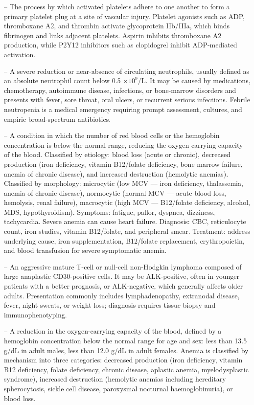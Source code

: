 -- The process by which activated platelets adhere to one another to form a primary platelet plug at a site of vascular injury. Platelet agonists such as ADP, thromboxane A2, and thrombin activate glycoprotein IIb/IIIa, which binds fibrinogen and links adjacent platelets. Aspirin inhibits thromboxane A2 production, while P2Y12 inhibitors such as clopidogrel inhibit ADP-mediated activation.

-- A severe reduction or near-absence of circulating neutrophils, usually defined as an absolute neutrophil count below 0.5 $\times 10^9$/L. It may be caused by medications, chemotherapy, autoimmune disease, infections, or bone-marrow disorders and presents with fever, sore throat, oral ulcers, or recurrent serious infections. Febrile neutropenia is a medical emergency requiring prompt assessment, cultures, and empiric broad-spectrum antibiotics.

-- A condition in which the number of red blood cells or the hemoglobin concentration is below the normal range, reducing the oxygen-carrying capacity of the blood. Classified by etiology: blood loss (acute or chronic), decreased production (iron deficiency, vitamin B12/folate deficiency, bone marrow failure, anemia of chronic disease), and increased destruction (hemolytic anemias). Classified by morphology: microcytic (low MCV — iron deficiency, thalassemia, anemia of chronic disease), normocytic (normal MCV — acute blood loss, hemolysis, renal failure), macrocytic (high MCV — B12/folate deficiency, alcohol, MDS, hypothyroidism). Symptoms: fatigue, pallor, dyspnea, dizziness, tachycardia. Severe anemia can cause heart failure. Diagnosis: CBC, reticulocyte count, iron studies, vitamin B12/folate, and peripheral smear. Treatment: address underlying cause, iron supplementation, B12/folate replacement, erythropoietin, and blood transfusion for severe symptomatic anemia.

-- An aggressive mature T-cell or null-cell non-Hodgkin lymphoma composed of large anaplastic CD30-positive cells. It may be ALK-positive, often in younger patients with a better prognosis, or ALK-negative, which generally affects older adults. Presentation commonly includes lymphadenopathy, extranodal disease, fever, night sweats, or weight loss; diagnosis requires tissue biopsy and immunophenotyping.

-- A reduction in the oxygen-carrying capacity of the blood, defined by a hemoglobin concentration below the normal range for age and sex: less than 13.5 g/dL in adult males, less than 12.0 g/dL in adult females. Anemia is classified by mechanism into three categories: decreased production (iron deficiency, vitamin B12 deficiency, folate deficiency, chronic disease, aplastic anemia, myelodysplastic syndrome), increased destruction (hemolytic anemias including hereditary spherocytosis, sickle cell disease, paroxysmal nocturnal haemoglobinuria), or blood loss.

